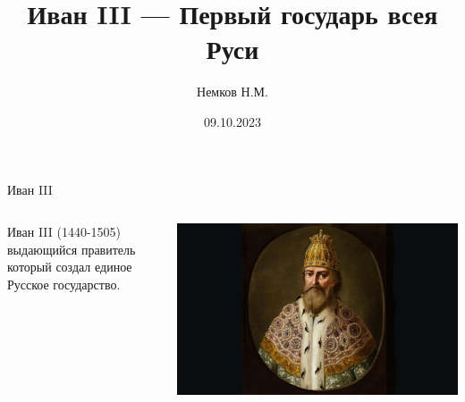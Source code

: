 

\title{Иван III --- Первый государь всея Руси}
\author{Немков Н.М.}
\date{09.10.2023}



\begin{frame}
\maketitle
\end{frame}




\begin{frame}{Иван III}
	\begin{columns}
		\begin{column}{0.45\textwidth}

			Иван III (1440-1505) выдающийся правитель который создал единое Русское государство.

		\end{column}

		\begin{column}{0.45\textwidth}

			\includegraphics[width=1\textwidth]{images/ivan-1}

		\end{column}
	\end{columns}
\end{frame}

